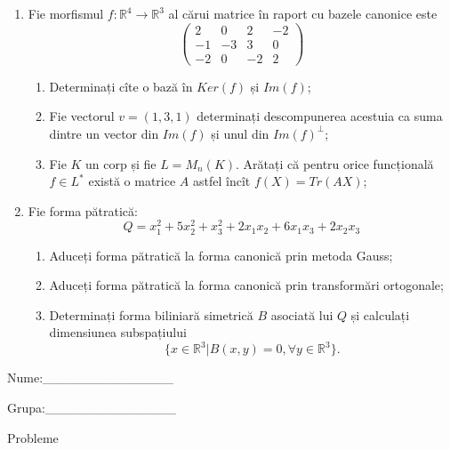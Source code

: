 \documentclass{article}
\begin{document}
\begin{enumerate}
 \item Fie morfismul $f:\mathbb{R}^4 \to \mathbb{R}^3$ al cărui matrice în raport cu bazele canonice este
$$\begin{pmatrix}
2&0&2&-2\\
-1&-3&3&0\\
-2&0&-2&2
\end{pmatrix}$$

\begin{enumerate}
\item Determinați cîte o bază în $Ker(f)$ și $Im(f)$;
\item Fie vectorul $v=(1,3,1)$ determinați descompunerea acestuia ca suma dintre un vector din $Im(f)$ și unul din $Im(f)^\perp$;
\item Fie $K$ un corp și fie $L=M_n(K)$. Arătați că pentru orice funcțională $f \in L^*$ există o matrice $A$ astfel încît $f(X)=Tr(AX)$;
\end{enumerate}
\item Fie forma pătratică:
$$Q= x_1^2+5x_2^2+x_3^2+2x_1x_2+6x_1x_3+2x_2x_3$$

\begin{enumerate}
\item Aduceți forma pătratică la forma canonică prin metoda Gauss;
\item Aduceți forma pătratică la forma canonică prin transformări ortogonale;
\item Determinați forma biliniară simetrică $B$ asociată lui $Q$ și calculați dimensiunea subspațiului
$$\{x \in \mathbb{R}^3 | B(x,y)=0,\forall y \in \mathbb{R}^3\}.$$

\end{enumerate}
\end{enumerate}
\newpage
\begin{flushright}
Nume:\_\_\_\_\_\_\_\_\_\_\_\_\_\_
 
 
Grupa:\_\_\_\_\_\_\_\_\_\_\_\_\_\_
\end{flushright}
\begin{center}
\vspace{2cm}
{\Large Probleme}
\vspace{2cm}
\end{center}
\end{document}
